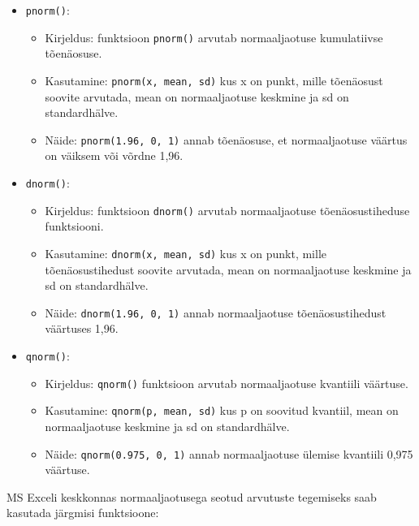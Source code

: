 \documentclass[
]{book}
\providecommand{\tightlist}{%
  \setlength{\itemsep}{0pt}\setlength{\parskip}{0pt}}
\begin{document}
\begin{itemize}
\tightlist
\item
  \texttt{pnorm()}:

  \begin{itemize}
  \tightlist
  \item
    Kirjeldus: funktsioon \texttt{pnorm()} arvutab normaaljaotuse kumulatiivse tõenäosuse.
  \item
    Kasutamine: \texttt{pnorm(x,\ mean,\ sd)} kus x on punkt, mille tõenäosust soovite arvutada, mean on normaaljaotuse keskmine ja sd on standardhälve.
  \item
    Näide: \texttt{pnorm(1.96,\ 0,\ 1)} annab tõenäosuse, et normaaljaotuse väärtus on väiksem või võrdne 1,96.
  \end{itemize}
\item
  \texttt{dnorm()}:

  \begin{itemize}
  \tightlist
  \item
    Kirjeldus: funktsioon \texttt{dnorm()} arvutab normaaljaotuse tõenäosustiheduse funktsiooni.
  \item
    Kasutamine: \texttt{dnorm(x,\ mean,\ sd)} kus x on punkt, mille tõenäosustihedust soovite arvutada, mean on normaaljaotuse keskmine ja sd on standardhälve.
  \item
    Näide: \texttt{dnorm(1.96,\ 0,\ 1)} annab normaaljaotuse tõenäosustihedust väärtuses 1,96.
  \end{itemize}
\item
  \texttt{qnorm()}:

  \begin{itemize}
  \tightlist
  \item
    Kirjeldus: \texttt{qnorm()} funktsioon arvutab normaaljaotuse kvantiili väärtuse.
  \item
    Kasutamine: \texttt{qnorm(p,\ mean,\ sd)} kus p on soovitud kvantiil, mean on normaaljaotuse keskmine ja sd on standardhälve.
  \item
    Näide: \texttt{qnorm(0.975,\ 0,\ 1)} annab normaaljaotuse ülemise kvantiili 0,975 väärtuse.
  \end{itemize}
\end{itemize}

MS Exceli keskkonnas normaaljaotusega seotud arvutuste tegemiseks saab kasutada järgmisi funktsioone:
\end{document}

